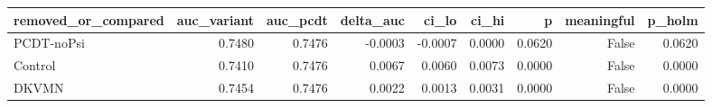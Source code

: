 \begin{tabular}{lrrrrrrrr}
\toprule
removed\_or\_compared & auc\_variant & auc\_pcdt & delta\_auc & ci\_lo & ci\_hi & p & meaningful & p\_holm \\
\midrule
PCDT-noPsi & 0.7480 & 0.7476 & -0.0003 & -0.0007 & 0.0000 & 0.0620 & False & 0.0620 \\
Control & 0.7410 & 0.7476 & 0.0067 & 0.0060 & 0.0073 & 0.0000 & False & 0.0000 \\
DKVMN & 0.7454 & 0.7476 & 0.0022 & 0.0013 & 0.0031 & 0.0000 & False & 0.0000 \\
\bottomrule
\end{tabular}
